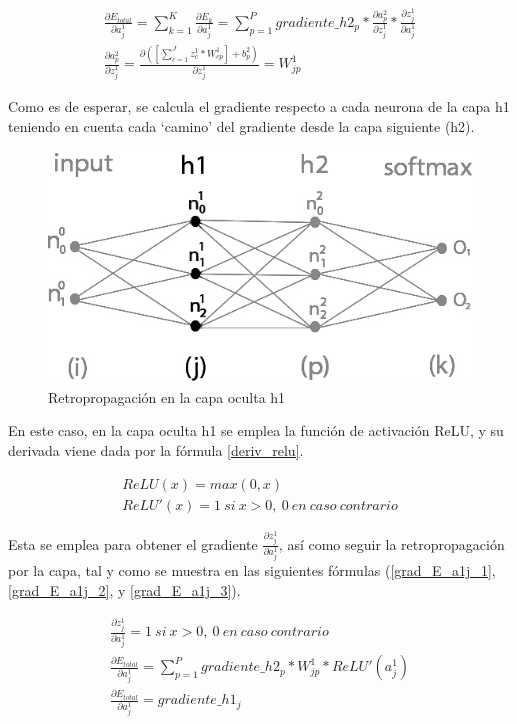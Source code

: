 \begin{gather}
	\frac{\partial E_{total}}{\partial a^1_j} = \sum_{k=1}^K \frac{\partial E_k}{\partial a^1_j} = \sum_{p=1}^P  gradiente\_h2_p * \frac{\partial a^2_p}{\partial z^1_j} * \frac{\partial z^1_j}{\partial a^1_j} \\
	\frac{\partial a^2_p}{\partial z^1_j} = \frac{\partial( [\sum_{c=1}^{J} z^1_c * W^1_{cp}] + b^2_p)}{\partial z^1_j} = W^1_{jp}
\end{gather}

Como es de esperar, se calcula el gradiente respecto a cada neurona de la capa h1 teniendo en cuenta cada `camino' del gradiente desde la capa siguiente (h2).

\begin{figure}[H]
	\centering
	\includegraphics[scale=0.35]{imagenes/nn_2_capa_h1.jpg}  
	\caption{Retropropagación en la capa oculta h1}
\end{figure}

En este caso, en la capa oculta h1 se emplea la función de activación ReLU, y su derivada viene dada por la fórmula \ref{deriv_relu}. 

\begin{gather}
	ReLU(x) = max(0, x) \\
	ReLU'(x) = 1\ si\ x>0,\ 0\ en\ caso\ contrario
	\label{deriv_relu}
\end{gather}

Esta se emplea para obtener el gradiente $\frac{\partial z^1_ j}{\partial a^1_j}$, así como seguir la retropropagación por la capa, tal y como se muestra en las siguientes fórmulas (\ref{grad_E_a1j_1}, \ref{grad_E_a1j_2}, y \ref{grad_E_a1j_3}).


\begin{gather}
	\frac{\partial z^1_ j}{\partial a^1_j} = 1\ si\ x>0,\ 0\ en\ caso\ contrario \label{grad_E_a1j_1} \\
	\frac{\partial E_{total}}{\partial a^1_j} = \sum_{p=1}^P  gradiente\_h2_p * W^1_{jp} * ReLU'(a^1_j) \label{grad_E_a1j_2} \\
	\frac{\partial E_{total}}{\partial a^1_j} = gradiente\_h1_j
	\label{grad_E_a1j_3}
\end{gather}

